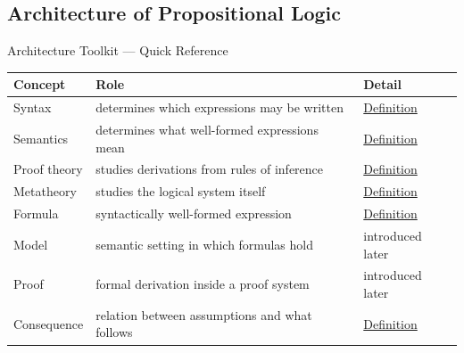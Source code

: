 \subsection{Architecture of Propositional Logic}
\label{sec:propositional-logic-architecture}

\begin{toolkitbox}{Architecture Toolkit --- Quick Reference}
\small
\begin{tabularx}{\textwidth}{l X l}
\toprule
\textbf{Concept} & \textbf{Role} & \textbf{Detail} \\
\midrule
Syntax & determines which expressions may be written & \hyperref[def:propositional-logic-syntax]{Definition} \\
Semantics & determines what well-formed expressions mean & \hyperref[def:propositional-logic-semantics]{Definition} \\
Proof theory & studies derivations from rules of inference & \hyperref[def:propositional-logic-proof-theory]{Definition} \\
Metatheory & studies the logical system itself & \hyperref[def:propositional-logic-metatheory]{Definition} \\
Formula & syntactically well-formed expression & \hyperref[def:well-formed-formula]{Definition} \\
Model & semantic setting in which formulas hold & introduced later \\
Proof & formal derivation inside a proof system & introduced later \\
Consequence & relation between assumptions and what follows & \hyperref[def:logical-consequence-propositional-logic]{Definition} \\
\bottomrule
\end{tabularx}
\end{toolkitbox}

